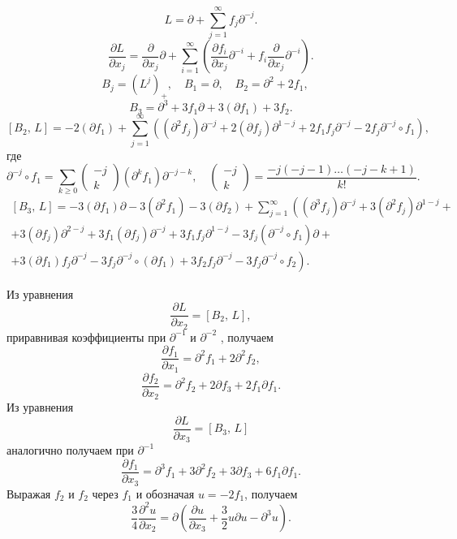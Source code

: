 \documentclass[a4paper]{article}
\begin{document}
\begin{sol}
\[
L=\partial+ \sum_{j=1}^{\infty} f_j \partial^{-j}
.\] 
\[
\frac{\partial L}{\partial x_j}=
\frac{\partial }{\partial x_j} \partial
+\sum_{i=1}^{\infty} \left( \frac{\partial f_i}{\partial x_j}\partial^{-i}+f_i \frac{\partial }{\partial x_j} \partial^{-i}  \right) 
.\] 
\[
	B_j=\left( L^j \right) _{+},\quad
	B_1=\partial,\quad B_2=\partial^2+2f_{1},\quad
\] 
\[
	B_3=\partial^3+3f_1 \partial+ 3\left( \partial
	f_1\right) +3 f_2
.\] 
\[
	\left[ B_2,\,L \right] =-2(\partial f_1)+
	\sum_{j=1}^{\infty} \left( 
	(\partial^2 f_j) \partial^{-j}+2\left( \partial f_j \right) \partial^{1-j}+2f_1 f_j \partial^{-j}-2f_j \partial^{-j}\circ f_1\right)
,\] 
где
\[
	\partial^{-j} \circ f_1= \sum_{k\ge 0}^{} \begin{pmatrix} -j\\k \end{pmatrix} \left( \partial^k f_1 \right) 
	\partial^{-j-k},\quad
	\begin{pmatrix}-j\\k  \end{pmatrix} =
	\frac{-j(-j-1)\ldots(-j-k+1)}{k!}
.\] 
\begin{multline*}
\left[ B_3,\,L \right] =-
3(\partial f_1)\partial-
3(\partial^2 f_1)-3(\partial f_2)+
\sum_{j=1}^{\infty} \left( \left( \partial^3 f_j  \right)\partial^{-j} +
	3\left( \partial^2 f_j \right)\partial^{1-j}
	\right. + \\ + \left.3\left( \partial f_j \right) \partial^{2-j}
	+3f_1 (\partial f_j) \partial^{-j}+
	3 f_1 f_j \partial^{1-j}-
	3f_j(\partial^{-j}\circ f_1) \partial\right. + \\ + \left.
	3(\partial f_1)f_j\partial^{-j}-
	3f_j \partial^{-j}\circ \left( \partial f_1 \right) 
+3f_2 f_j \partial^{-j}-
	3f_j\partial^{-j}\circ f_2
\right) 
.\end{multline*} 

Из уравнения
\[
\frac{\partial L}{\partial x_2} =\left[ B_2,\,L \right] 
,\] 
приравнивая коэффициенты при $\partial^{-1}$ и $\partial^{-2}$ , получаем
\[
	\frac{\partial f_1}{\partial x_1} 
	=\partial^2 f_1+2 \partial^2 f_2
,\]
\[
\frac{\partial f_2}{\partial x_2} =\partial^2 f_2+2\partial f_3
+2f_1 \partial f_1
.\] 
Из уравнения
\[
\frac{\partial L}{\partial x_3} = \left[ B_3,\,L \right] 
\] 
аналогично получаем при $\partial^{-1}$ 
\[
\frac{\partial f_1}{\partial x_3} =
\partial^3 f_1 +3\partial^2 f_2+3\partial f_3+6 f_1 \partial f_1
.\] 
Выражая $f_2$ и $f_2$ через $f_1$ и обозначая $u=-2f_1$,
получаем
\[
\frac{3}{4}\frac{\partial ^2 u}{\partial x_2} =
\partial\left( \frac{\partial u}{\partial x_3} +\frac{3}{2} u\partial u-
\partial^3 u\right) 
.\] 
\end{sol}
\end{document}
